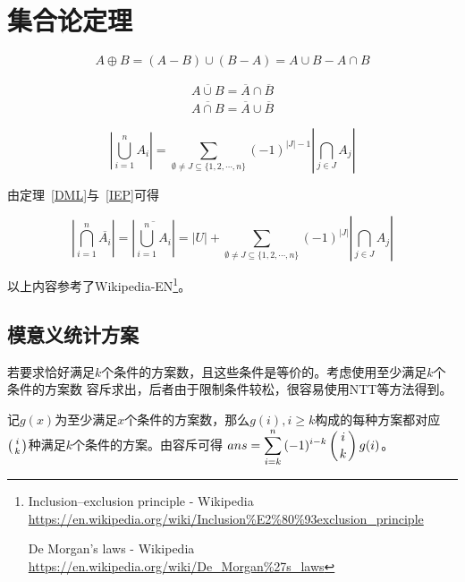 \section{集合论定理}
\begin{theorem}[对称差]
	\begin{displaymath}
		A\oplus B=(A-B)\cup(B-A)=A\cup B - A\cap B
	\end{displaymath}
\end{theorem}
\begin{theorem}\label{DML}
	\begin{eqnarray*}
		\overline{A\cup B}=\overline{A}\cap \overline{B} \\
		\overline{A\cap B}=\overline{A}\cup \overline{B}
	\end{eqnarray*}
\end{theorem}
\begin{theorem}\label{IEP}
	\begin{displaymath}
		\left|\bigcup_{i=1}^n{A_i}\right|=
		\sum_{\emptyset \neq J\subseteq \{1,2,\cdots,n\}}{(-1)^{|J|-1}
			\left|\bigcap_{j\in J}{A_j}\right|}
	\end{displaymath}
\end{theorem}

由定理~\ref{DML}与~\ref{IEP}可得

\begin{theorem}\label{ExDML}
	\begin{displaymath}
		\left|\bigcap_{i=1}^n\overline{A_i}\right|=
		\left|\overline{\bigcup_{i=1}^n{A_i}}\right|=
		|U|+\sum_{\emptyset \neq J\subseteq \{1,2,\cdots,n\}}{(-1)^{|J|}
			\left|\bigcap_{j\in J}{A_j}\right|}
	\end{displaymath}
\end{theorem}

以上内容参考了Wikipedia-EN\footnote{Inclusion–exclusion principle - Wikipedia\\
	\url{https://en.wikipedia.org/wiki/Inclusion\%E2\%80\%93exclusion\_principle}

	De Morgan's laws - Wikipedia\\
    \url{https://en.wikipedia.org/wiki/De\_Morgan\%27s\_laws}}。

\subsection{模意义统计方案}
若要求恰好满足$k$个条件的方案数，且这些条件是等价的。考虑使用至少满足$k$个条件的方案数
容斥求出，后者由于限制条件较松，很容易使用NTT等方法得到。

记$g(x)$为至少满足$x$个条件的方案数，那么$g(i),i\geq k$构成的每种方案都对应
$\left(i \atop k\right)$种满足$k$个条件的方案。由容斥可得
$ans=\displaystyle \sum_{i=k}^n{(-1)^{i-k}\left(i \atop k\right)g(i)}$。
